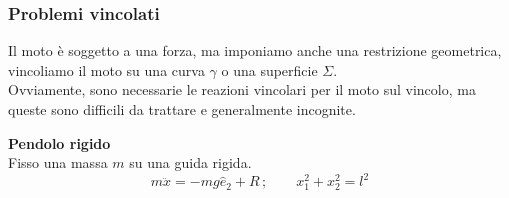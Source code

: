 \subsubsection{Problemi vincolati}
Il moto è soggetto a una forza, ma imponiamo anche una restrizione geometrica, 
vincoliamo il moto su una curva $\gamma$ o una superficie $\Sigma$.\\
Ovviamente, sono necessarie le reazioni vincolari per il moto sul vincolo, ma queste sono difficili da trattare
e generalmente incognite.
\begin{example}
    \textbf{Pendolo rigido} \\
    Fisso una massa $m $ su una guida rigida.
    \begin{equation}
        m\ddot{x}= -mg\hat{e }_2 +R\,;\qquad x_1^2+x_2^2 = l^2
    \end{equation}


\end{example}
